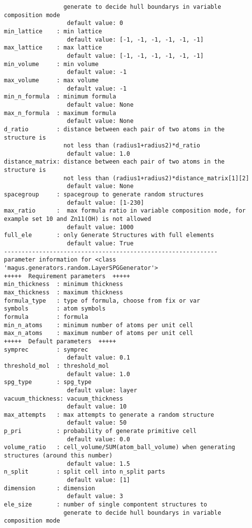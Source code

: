 \documentclass[12pt,oneside]{book}
\begin{document}
\begin{tcolorbox}
\begin{verbatim}
                 generate to decide hull boundarys in variable composition mode
                  default value: 0
min_lattice    : min lattice
                  default value: [-1, -1, -1, -1, -1, -1]
max_lattice    : max lattice
                  default value: [-1, -1, -1, -1, -1, -1]
min_volume     : min volume
                  default value: -1
max_volume     : max volume
                  default value: -1
min_n_formula  : minimum formula
                  default value: None
max_n_formula  : maximum formula
                  default value: None
d_ratio        : distance between each pair of two atoms in the structure is
                 not less than (radius1+radius2)*d_ratio
                  default value: 1.0
distance_matrix: distance between each pair of two atoms in the structure is
                 not less than (radius1+radius2)*distance_matrix[1][2]
                  default value: None
spacegroup     : spacegroup to generate random structures
                  default value: [1-230]
max_ratio      :  max formula ratio in variable composition mode, for example set 10 and Zn11(OH) is not allowed
                  default value: 1000
full_ele       : only Generate Structures with full elements
                  default value: True
-------------------------------------------------------------
parameter information for <class 'magus.generators.random.LayerSPGGenerator'>
+++++  Requirement parameters  +++++
min_thickness  : minimum thickness
max_thickness  : maximum thickness
formula_type   : type of formula, choose from fix or var
symbols        : atom symbols
formula        : formula
min_n_atoms    : minimum number of atoms per unit cell
max_n_atoms    : maximum number of atoms per unit cell
+++++  Default parameters  +++++
symprec        : symprec
                  default value: 0.1
threshold_mol  : threshold_mol
                  default value: 1.0
spg_type       : spg_type
                  default value: layer
vacuum_thickness: vacuum_thickness
                  default value: 10
max_attempts   : max attempts to generate a random structure
                  default value: 50
p_pri          : probability of generate primitive cell
                  default value: 0.0
volume_ratio   : cell_volume/SUM(atom_ball_volume) when generating structures (around this number)
                  default value: 1.5
n_split        : split cell into n_split parts
                  default value: [1]
dimension      : dimension
                  default value: 3
ele_size       : number of single compontent structures to
                 generate to decide hull boundarys in variable composition mode

\end{verbatim}
\end{tcolorbox}
\end{document}
